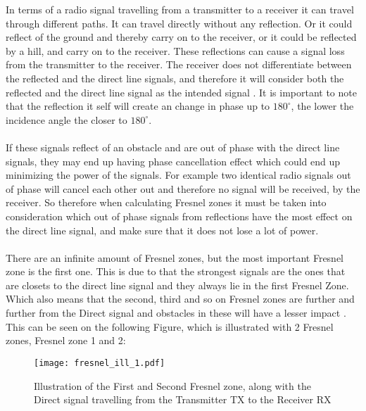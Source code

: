 In terms of a radio signal travelling from a transmitter to a receiver it can travel through different paths. It can travel directly without any reflection. %
Or it could reflect of the ground and thereby carry on to the receiver, or it could be reflected by a hill, and carry on to the receiver. %
These reflections can cause a signal loss from the transmitter to the receiver. The receiver does not differentiate between the reflected and the direct line signals, and therefore it will consider both the reflected and the direct line signal as the intended signal \citep{Fres2}. It is important to note that the reflection it self will create an change in phase up to $180^{\circ}$, the lower the incidence angle the closer to $180^{\circ}$.  %
\\
\\
If these signals reflect of an obstacle and are out of phase with the direct line signals, they may end up having phase cancellation effect which could end up minimizing the power of the signals. For example two identical radio signals out of phase will cancel each other out and therefore no signal will be received, by the receiver. So therefore when calculating Fresnel zones it must be taken into consideration which out of phase signals from reflections have the most effect on the direct line signal, and make sure that it does not lose a lot of power. 
\\
\\
There are an infinite amount of Fresnel zones, but the most important Fresnel zone is the first one. This is due to that the strongest signals are the ones that are closets to the direct line signal %
and they always lie in the first Fresnel Zone.  
Which also means that the second, third and so on Fresnel zones are further and further from the Direct signal and obstacles in these will have a lesser impact \citep{introRF}. This can be seen on the following Figure, which is illustrated with 2 Fresnel zones, Fresnel zone 1 and 2:
\begin{figure}[H]
\centering
\texttt{[image: fresnel\_ill\_1.pdf]}
\caption{Illustration of the First and Second Fresnel zone, along with the Direct signal travelling from the Transmitter TX to the Receiver RX}
\label{dijdk}
\end{figure}

